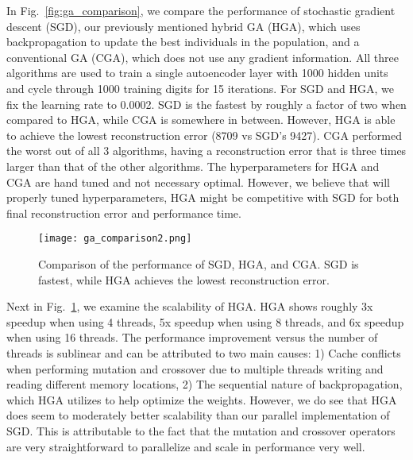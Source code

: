 In Fig.~\ref{fig:ga_comparison}, we compare the performance of stochastic gradient descent (SGD), our previously mentioned hybrid GA (HGA), which uses backpropagation to update the best individuals in the population, and a conventional GA (CGA), which does not use any gradient information. All three algorithms are used to train a single autoencoder layer with 1000 hidden units and cycle through 1000 training digits for 15 iterations. For SGD and HGA, we fix the learning rate to 0.0002. SGD is the fastest by roughly a factor of two when compared to HGA, while CGA is somewhere in between. However, HGA is able to achieve the lowest reconstruction error (8709 vs SGD's 9427). CGA performed the worst out of all 3 algorithms, having a reconstruction error that is three times larger than that of the other algorithms. The hyperparameters for HGA and CGA are hand tuned and not necessary optimal. However, we believe that will properly tuned hyperparameters, HGA might be competitive with SGD for both final reconstruction error and performance time. 

\begin{figure}[h] \centering
	\texttt{[image: ga\_comparison2.png]}
	\caption{Comparison of the performance of SGD, HGA, and CGA. SGD is fastest, while HGA achieves the lowest reconstruction error.}
	\label{fig:ga_comparison2}
\end{figure}

Next in Fig.~\ref{fig:ga_comparison2}, we examine the scalability of HGA. HGA shows roughly 3x speedup when using 4 threads, 5x speedup when using 8 threads, and 6x speedup when using 16 threads. The performance improvement versus the number of threads is sublinear and can be attributed to two main causes: 1) Cache conflicts when performing mutation and crossover due to multiple threads writing and reading different memory locations, 2) The sequential nature of backpropagation, which HGA utilizes to help optimize the weights. However, we do see that HGA does seem to moderately better scalability than our parallel implementation of SGD. This is attributable to the fact that the mutation and crossover operators are very straightforward to parallelize and scale in performance very well. 

\FloatBarrier
